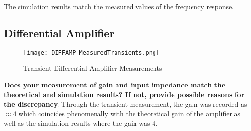 \documentclass{article}
\begin{document}
\vspace{1em}
The simulation results match the measured values of the frequency
response.


\subsection*{Differential Amplifier}
\begin{figure}[H]
  \centering 
  \texttt{[image: DIFFAMP-MeasuredTransients.png]} 
  \caption{Transient Differential Amplifier Measurements}
\end{figure}

\textbf{
Does your measurement of gain and input impedance match the
theoretical and simulation results? If not, provide possible
reasons for the discrepancy.
}
Through the transient measurement, the gain was recorded as $\approx 4$ which coincides
phenomenally with the theoretical gain of the amplifier as well as the simulation
results where the gain was 4. 
\end{document}
